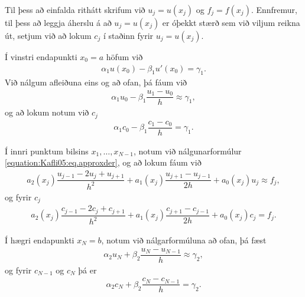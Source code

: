 \documentclass[a4paper,10pt,icelandic]{sphinxmanual}
\begin{document}
Til þess að einfalda rithátt skrifum við \(u_j=u(x_j)\)  og  \(f_j=f(x_j)\).
Ennfremur, til þess að leggja áherslu á að \(u_j=u(x_j)\) er óþekkt stærð sem við viljum reikna út, setjum við að lokum \(c_j\) í staðinn fyrir \(u_j=u(x_j)\).


Í vinstri endapunkti \(x_0=a\) höfum við
\begin{equation*}
\begin{split}\alpha_1u(x_0)-\beta_1u'(x_0)=\gamma_1.\end{split}
\end{equation*}
Við nálgum afleiðuna eins og að ofan, þá fáum við
\begin{equation*}
\begin{split}\alpha_1 u_0-\beta_1\dfrac{u_1-u_0}h\approx \gamma_1,\end{split}
\end{equation*}
og að lokum notum við \(c_j\)
\begin{equation*}
\begin{split}\alpha_1c_0-\beta_1\dfrac{c_1-c_0}h= \gamma_1.\end{split}
\end{equation*}

Í innri punktum bilsins \(x_1, \dots, x_{N-1}\), notum við nálgunarformúlur \eqref{equation:Kafli05:eq.approxder}, og að lokum fáum við
\begin{equation*}
\begin{split}a_2(x_j)\dfrac{u_{j-1}-2u_j+u_{j+1}}{h^2}+a_1(x_j)
\dfrac{u_{j+1}-u_{j-1}}{2h}+a_0(x_j)u_j\approx f_j,\end{split}
\end{equation*}
og fyrir \(c_j\)
\begin{equation*}
\begin{split}a_2(x_j)\dfrac{c_{j-1}-2c_j+c_{j+1}}{h^2}+a_1(x_j)
\dfrac{c_{j+1}-c_{j-1}}{2h}+a_0(x_j)c_j=f_j.\end{split}
\end{equation*}

Í hægri endapunkti \(x_N=b\), notum við nálgarformúluna að ofan, þá fæst
\begin{equation*}
\begin{split}\alpha_2u_N+\beta_2\dfrac{u_N-u_{N-1}}h\approx \gamma_2,\end{split}
\end{equation*}
og fyrir \(c_{N-1}\) og \(c_N\) þá er
\begin{equation*}
\begin{split}\alpha_2c_N+\beta_2\dfrac{c_N-c_{N-1}}h = \gamma_2.\end{split}
\end{equation*}
\end{document}
